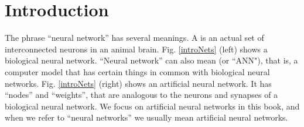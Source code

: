 
\chapter{Introduction}\label{ch_intro}



The phrase ``neural network'' has several meanings. A  is an actual set of interconnected neurons in an animal brain. Fig. \ref{introNets} (left) shows a biological neural network. ``Neural network'' can also mean  (or ``ANN"),  that is, a computer model that has certain things in common with biological neural networks. Fig. \ref{introNets} (right) shows an artificial neural network. It has ``nodes'' and ``weights'', that are analogous to the neurons and synapses of a biological neural network. We focus on artificial neural networks in this book, and when we refer to ``neural networks'' we usually mean artificial neural networks.

